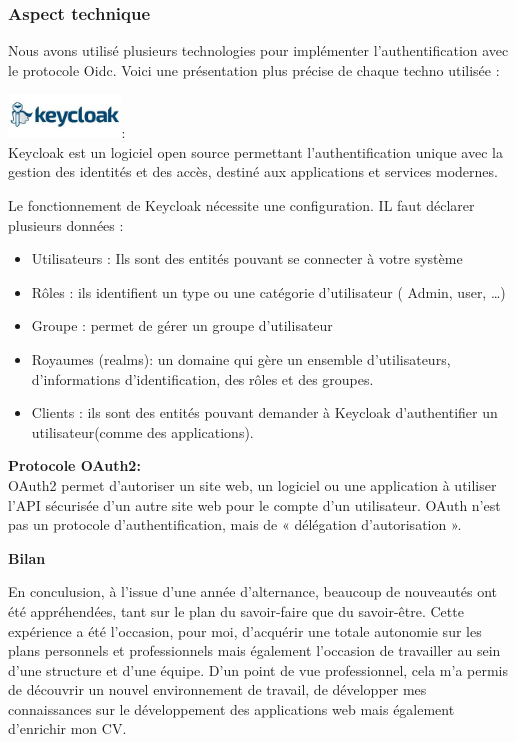 \documentclass[12pt]{article}
\begin{document}
\subsubsection{Aspect technique}

Nous avons utilisé plusieurs technologies pour implémenter l'authentification avec le protocole Oidc. Voici une présentation plus précise de chaque techno utilisée : 

\includegraphics[width=30mm,scale=0.5]{diagrammes/logo_Keycloak.jpeg}: \\

Keycloak  est un logiciel open source permettant l'authentification unique avec la gestion des identités et des accès, destiné aux applications et services modernes. 

Le fonctionnement de Keycloak nécessite une configuration. IL faut déclarer plusieurs données : 
\begin{itemize}
\item Utilisateurs : Ils sont des entités pouvant se connecter à votre système
\item Rôles : ils identifient un type ou une catégorie d’utilisateur ( Admin, user, …)
\item Groupe : permet de gérer un groupe d’utilisateur
\item Royaumes (realms): un domaine qui gère un ensemble d’utilisateurs, d’informations d’identification, des rôles et des groupes.
\item Clients : ils sont des entités pouvant demander à Keycloak d’authentifier un utilisateur(comme des applications).
\end{itemize}
 
\textbf{Protocole OAuth2:}\\ 

OAuth2 permet d'autoriser un site web, un logiciel ou une application à utiliser l'API sécurisée d'un autre site web pour le compte d'un utilisateur. OAuth n'est pas un protocole d'authentification, mais de « délégation d'autorisation ».
\newpage

\begin{center}
\bfseries {Bilan}
\end{center}

En conculusion, à l'issue d'une année d'alternance, beaucoup de nouveautés ont été appréhendées, tant sur le plan du savoir-faire que du savoir-être. Cette expérience a été l'occasion, pour moi, d'acquérir une totale autonomie sur les plans personnels et professionnels mais également l'occasion de travailler au sein d'une structure et d'une équipe. D'un point de vue professionnel, cela m'a permis de découvrir un nouvel environnement de travail, de développer mes connaissances sur le développement des applications web mais également d'enrichir mon CV. \\
\end{document}
